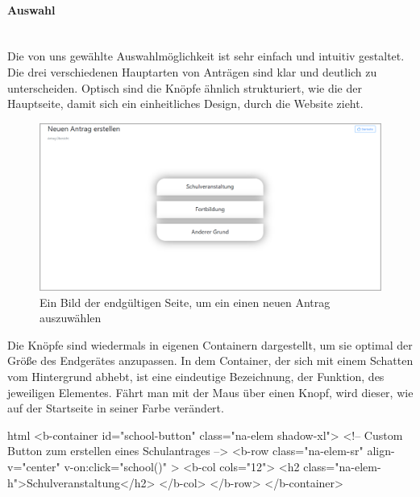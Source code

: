 \paragraph{Auswahl}
~\\
Die von uns gewählte Auswahlmöglichkeit ist sehr einfach und intuitiv gestaltet. Die drei verschiedenen Hauptarten von Anträgen sind klar und deutlich zu unterscheiden. Optisch sind die Knöpfe ähnlich strukturiert, wie die der Hauptseite, damit sich ein einheitliches Design, durch die Website zieht.
\begin{figure}[H]
	\centering
	\includegraphics[width=1\linewidth]{images/website/neu}
	\caption[Neuer Antrag Auswahl]{Ein Bild der endgültigen Seite, um ein einen neuen Antrag auszuwählen}
	\label{fig:neuauswahl}
\end{figure}
Die Knöpfe sind wiedermals in eigenen Containern dargestellt, um sie optimal der Größe des Endgerätes anzupassen. In dem Container, der sich mit einem Schatten vom Hintergrund abhebt, ist eine eindeutige Bezeichnung, der Funktion, des jeweiligen Elementes. Fährt man mit der Maus über einen Knopf, wird dieser, wie auf der Startseite in seiner Farbe verändert.
\begin{code}{html}
	<b-container id="school-button" class="na-elem shadow-xl">
	<!-- Custom Button zum erstellen eines Schulantrages -->
	<b-row
	  class="na-elem-sr"
	  align-v="center"
	  v-on:click="school()"
	>
	  <b-col cols="12">
		<h2 class="na-elem-h">Schulveranstaltung</h2>
	  </b-col>
	</b-row>
  </b-container>	
\end{code}
	\label{list:htmlselect} ~\\
